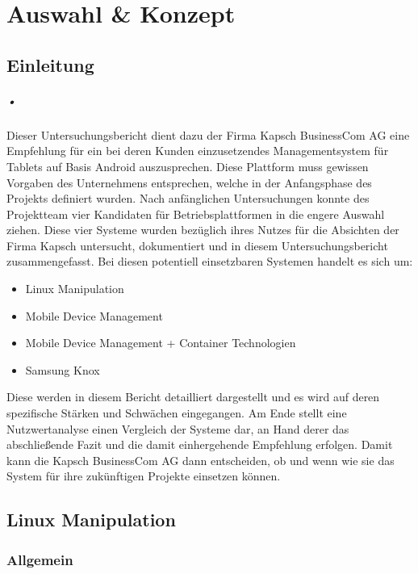 \chapter{Auswahl \& Konzept}
\section{Einleitung}
\paragraph*{•}
Dieser Untersuchungsbericht dient dazu der Firma Kapsch BusinessCom AG eine Empfehlung für ein bei deren Kunden einzusetzendes Managementsystem für Tablets auf Basis Android auszusprechen. Diese Plattform muss gewissen Vorgaben des Unternehmens entsprechen, welche in der Anfangsphase des Projekts definiert wurden. Nach anfänglichen Untersuchungen konnte des Projektteam vier Kandidaten für Betriebsplattformen in die engere Auswahl ziehen. Diese vier Systeme wurden bezüglich ihres Nutzes für die Absichten der Firma Kapsch untersucht, dokumentiert und in diesem Untersuchungsbericht zusammengefasst. Bei diesen potentiell einsetzbaren Systemen handelt es sich um:
\begin{itemize}
	\item Linux Manipulation
	\item Mobile Device Management
	\item Mobile Device Management + Container Technologien
	\item Samsung Knox
\end{itemize}
Diese werden in diesem Bericht detailliert dargestellt und es wird auf deren spezifische Stärken und Schwächen eingegangen. Am Ende stellt eine Nutzwertanalyse einen Vergleich der Systeme dar, an Hand derer das abschließende Fazit und die damit einhergehende Empfehlung erfolgen. Damit kann die Kapsch BusinessCom AG dann entscheiden, ob und wenn wie sie das System für ihre zukünftigen Projekte einsetzen können. 
\section{Linux Manipulation}
\subsection{Allgemein}
